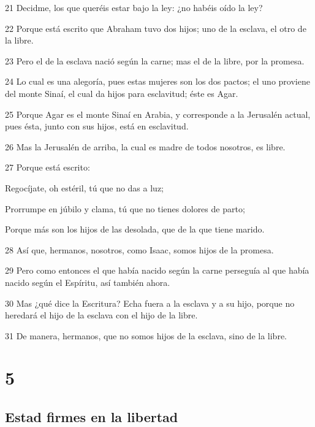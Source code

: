 \par 21 Decidme, los que queréis estar bajo la ley: ¿no habéis oído la ley?
\par 22 Porque está escrito que Abraham tuvo dos hijos; uno de la esclava, el otro de la libre.
\par 23 Pero el de la esclava nació según la carne; mas el de la libre, por la promesa.
\par 24 Lo cual es una alegoría, pues estas mujeres son los dos pactos; el uno proviene del monte Sinaí, el cual da hijos para esclavitud; éste es Agar.
\par 25 Porque Agar es el monte Sinaí en Arabia, y corresponde a la Jerusalén actual, pues ésta, junto con sus hijos, está en esclavitud.
\par 26 Mas la Jerusalén de arriba, la cual es madre de todos nosotros, es libre.
\par 27 Porque está escrito:
\par Regocíjate, oh estéril, tú que no das a luz;
\par Prorrumpe en júbilo y clama, tú que no tienes dolores de parto;
\par Porque más son los hijos de las desolada, que de la que tiene marido.
\par 28 Así que, hermanos, nosotros, como Isaac, somos hijos de la promesa.
\par 29 Pero como entonces el que había nacido según la carne perseguía al que había nacido según el Espíritu, así también ahora.
\par 30 Mas ¿qué dice la Escritura? Echa fuera a la esclava y a su hijo, porque no heredará el hijo de la esclava con el hijo de la libre.
\par 31 De manera, hermanos, que no somos hijos de la esclava, sino de la libre.

\chapter{5}

\section*{Estad firmes en la libertad}

